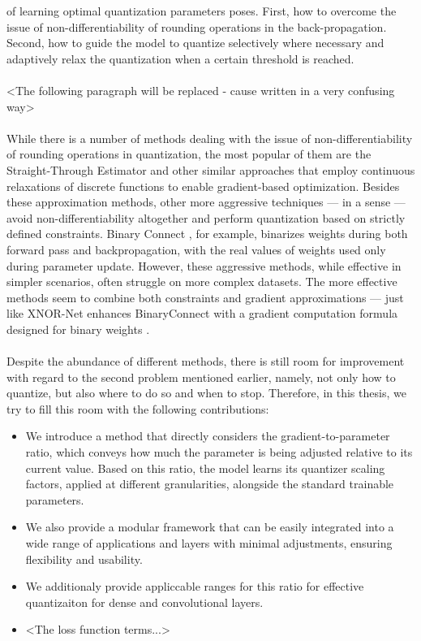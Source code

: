 of learning optimal quantization parameters poses. First, how to overcome the issue 
of non-differentiability of rounding operations in the back-propagation. 
Second, how to guide the model to quantize selectively where necessary
and adaptively relax the quantization when a certain threshold is reached. 
\\
\\
<The following paragraph will be replaced - cause written in a very confusing way>
\\
\\
While there is a number of methods dealing with the issue of non-differentiability of rounding operations
in quantization, the most popular of them are the Straight-Through Estimator and other similar approaches 
that employ continuous relaxations of discrete functions to enable gradient-based optimization. 
Besides these approximation methods, other more aggressive techniques — in a sense — avoid 
non-differentiability altogether and perform quantization based on strictly defined constraints. 
Binary Connect \cite{courbariaux2015binaryconnect}, for example, binarizes weights during both forward pass and backpropagation, 
with the real values of weights used only during parameter update. 
However, these aggressive methods, while effective in simpler scenarios, 
often struggle on more complex datasets. The more effective methods seem to combine both constraints 
and gradient approximations — just like XNOR-Net enhances BinaryConnect with a 
gradient computation formula designed for binary weights \cite{rastegari2016xnor}. 
\\
\\
Despite the abundance of different methods, there is still room for improvement with regard to the second problem mentioned earlier,
namely, not only how to quantize, but also where to do so and when to stop.
Therefore, in this thesis, we try to fill this room with the following contributions:
\begin{itemize}
    \item We introduce a method that directly considers the gradient-to-parameter ratio,
    which conveys how much the parameter is being adjusted relative to its current value.
    Based on this ratio, the model learns its quantizer scaling factors, applied at different granularities,
    alongside the standard trainable parameters.
    \item We also provide a modular framework that can be easily integrated into a wide range of applications and layers
    with minimal adjustments, ensuring flexibility and usability.
    \item We additionaly provide appliccable ranges for this ratio for effective quantizaiton for dense and convolutional layers.
    \item <The loss function terms...>
\end{itemize}
 